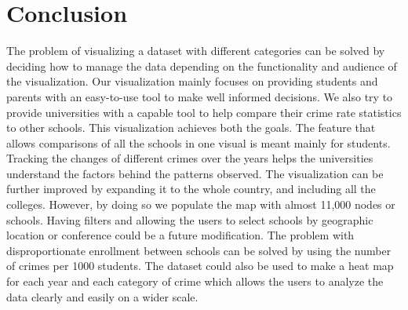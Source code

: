\documentclass[journal]{vgtc}                %
\begin{document}
\section{Conclusion} \label{conclusion}

The problem of visualizing a dataset with different categories can be solved by deciding how to manage the data depending on the functionality and audience of the visualization. Our visualization mainly focuses on providing students and parents with an easy-to-use tool to make well informed decisions. We also try to provide universities with a capable tool to help compare their crime rate statistics to other schools.
This visualization achieves both the goals. The feature that allows comparisons of all the schools in one visual is meant mainly for students. Tracking the changes of different crimes over the years helps the universities understand the factors behind the patterns observed.
The visualization can be further improved by expanding it to the whole country, and including all the colleges. However, by doing so we populate the map with almost 11,000 nodes or schools. Having filters and allowing the users to select schools by geographic location or conference could be a future modification. The problem with disproportionate enrollment between schools can be solved by using the number of crimes per 1000 students. The dataset could also be used to make a heat map for each year and each category of crime which allows the users to analyze the data clearly and easily on a wider scale. 

%

%
%
%


\end{document}

